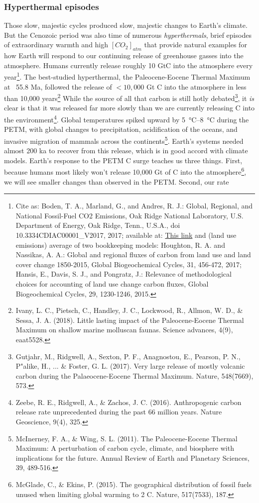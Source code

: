 \subsubsection{Hyperthermal episodes}
Those slow, majestic cycles produced slow, majestic changes to Earth's climate. But the Cenozoic period was also time of numerous \emph{hyperthermals}, brief episodes of extraordinary warmth and high $[CO_2]_{atm}$ that provide natural examples for how Earth will respond to our continuing release of greenhouse gasses into the atmosphere. Humans currently release roughly 10 GtC into the atmosphere every year\footnote{Cite as: Boden, T. A., Marland, G., and Andres, R. J.: Global, Regional, and National Fossil-Fuel CO2 Emissions, Oak Ridge National Laboratory, U.S. Department of Energy, Oak Ridge, Tenn., U.S.A., doi 10.3334\/CDIAC\/00001\_V2017, 2017; available at: \href{http://cdiac.ess-dive.lbl.gov/trends/emis/overview\_2014.html}{This link} and (land use emissions) average of two bookkeeping models: Houghton, R. A. and Nassikas, A. A.: Global and regional fluxes of carbon from land use and land cover change 1850-2015, Global Biogeochemical Cycles, 31, 456-472, 2017;  Hansis, E., Davis, S. J., and Pongratz, J.: Relevance of methodological choices for accounting of land use change carbon fluxes, Global Biogeochemical Cycles, 29, 1230-1246, 2015.}. The best-studied hyperthermal, the Paleocene-Eocene Thermal Maximum at ~55.8 Ma, followed the release of $<10,000$ Gt C into the atmosphere in less than 10,000 years\footnote{Ivany, L. C., Pietsch, C., Handley, J. C., Lockwood, R., Allmon, W. D., \& Sessa, J. A. (2018). Little lasting impact of the Paleocene-Eocene Thermal Maximum on shallow marine molluscan faunas. Science advances, 4(9), eaat5528.} While the source of all that carbon is still hotly debated\footnote{Gutjahr, M., Ridgwell, A., Sexton, P. F., Anagnostou, E., Pearson, P. N., P"alike, H., ... \& Foster, G. L. (2017). Very large release of mostly volcanic carbon during the Palaeocene-Eocene Thermal Maximum. Nature, 548(7669), 573.}, it \emph{is} clear is that it was released far more slowly than we are currently releasing C into the environment\footnote{Zeebe, R. E., Ridgwell, A., \& Zachos, J. C. (2016). Anthropogenic carbon release rate unprecedented during the past 66 million years. Nature Geoscience, 9(4), 325.}. Global temperatures spiked upward by \SIrange{5}{8}{\celsius} during the PETM, with global changes to precipitation, acidification of the oceans, and invasive migration of mammals across the continents\footnote{McInerney, F. A., \& Wing, S. L. (2011). The Paleocene-Eocene Thermal Maximum: A perturbation of carbon cycle, climate, and biosphere with implications for the future. Annual Review of Earth and Planetary Sciences, 39, 489-516.}. Earth's systems needed almost 200 ka to recover from this release, which is in good accord with climate models. Earth's response to the PETM C surge teaches us three things. First, because humans most likely won't release 10,000 Gt of C into the atmosphere\footnote{McGlade, C., \& Ekins, P. (2015). The geographical distribution of fossil fuels unused when limiting global warming to 2 C. Nature, 517(7533), 187.}, we will see smaller changes than observed in the PETM. Second, our rate 